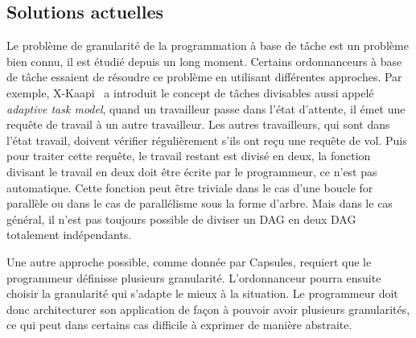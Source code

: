 \subsection{Solutions actuelles}
Le problème de granularité de la programmation à base de tâche est un problème bien connu, il est étudié depuis un long moment.
%
Certains ordonnanceurs à base de tâche essaient de résoudre ce problème en utilisant différentes approches.
%
Par exemple, X-Kaapi~\cite{xkaapi} a introduit le concept de tâches divisables aussi appelé {\em adaptive task model}, quand un travailleur passe dans l'état d'attente, il émet une requête de travail à un autre travailleur.
%
Les autres travailleurs, qui sont dans l'état travail, doivent vérifier régulièrement s'ils ont reçu une requête de vol.
%
Puis pour traiter cette requête, le travail restant est divisé en deux, la fonction divisant le travail en deux doit être écrite par le programmeur, ce n'est pas automatique.
%
Cette fonction peut être triviale dans le cas d'une boucle for parallèle ou dans le cas de parallélisme sous la forme d'arbre.
%
Mais dans le cas général, il n'est pas toujours possible de diviser un DAG en deux DAG totalement indépendants.


Une autre approche possible, comme donnée par Capsules\cite{capsules}, requiert que le programmeur définisse plusieurs granularité.
%
L'ordonnanceur pourra ensuite choisir la granularité qui s'adapte le mieux à la situation.
%
Le programmeur doit donc architecturer son application de façon à pouvoir avoir plusieurs granularités, ce qui peut dans certains cas difficile à exprimer de manière abstraite.
